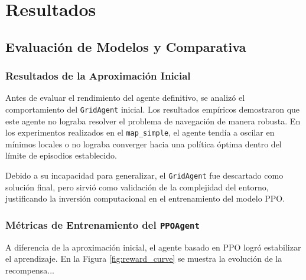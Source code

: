 \chapter{Resultados}

\section{Evaluación de Modelos y Comparativa}

\subsection{Resultados de la Aproximación Inicial}
Antes de evaluar el rendimiento del agente definitivo, se analizó el comportamiento del \texttt{GridAgent} inicial. Los resultados empíricos demostraron que este agente no lograba resolver el problema de navegación de manera robusta. En los experimentos realizados en el \texttt{map\_simple}, el agente tendía a oscilar en mínimos locales o no lograba converger hacia una política óptima dentro del límite de episodios establecido.

Debido a su incapacidad para generalizar, el \texttt{GridAgent} fue descartado como solución final, pero sirvió como validación de la complejidad del entorno, justificando la inversión computacional en el entrenamiento del modelo PPO.

\subsection{Métricas de Entrenamiento del \texttt{PPOAgent}}
A diferencia de la aproximación inicial, el agente basado en PPO logró estabilizar el aprendizaje. En la Figura \ref{fig:reward_curve} se muestra la evolución de la recompensa...